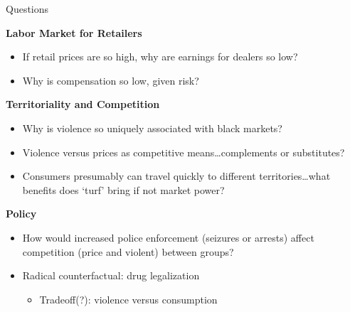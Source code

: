 \documentclass[10pt,ignorenonframetext,]{beamer}
\providecommand{\tightlist}{%
  \setlength{\itemsep}{0pt}\setlength{\parskip}{0pt}}
\begin{document}
\begin{frame}{Questions}
\protect\hypertarget{questions}{}

\textbf{Labor Market for Retailers}

\begin{itemize}
\tightlist
\item
  If retail prices are so high, why are earnings for dealers so low?
\item
  Why is compensation so low, given risk?
\end{itemize}

\textbf{Territoriality and Competition}

\begin{itemize}
\tightlist
\item
  Why is violence so uniquely associated with black markets?
\item
  Violence versus prices as competitive means\ldots complements or
  substitutes?
\item
  Consumers presumably can travel quickly to different
  territories\ldots what benefits does `turf' bring if not market power?
\end{itemize}

\textbf{Policy}

\begin{itemize}
\tightlist
\item
  How would increased police enforcement (seizures or arrests) affect
  competition (price and violent) between groups?
\item
  Radical counterfactual: drug legalization

  \begin{itemize}
  \tightlist
  \item
    Tradeoff(?): violence versus consumption
  \end{itemize}
\end{itemize}

\end{frame}
\end{document}
